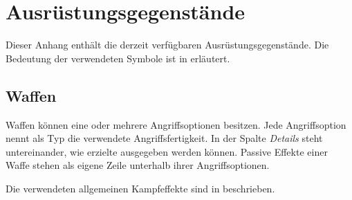\chapter{Ausrüstungsgegenstände}
\label{app:equipment}

Dieser Anhang enthält die derzeit verfügbaren Ausrüstungsgegenstände. Die Bedeutung der verwendeten Symbole ist in  erläutert.

\section{Waffen}

Waffen können eine oder mehrere Angriffsoptionen besitzen. Jede Angriffsoption nennt als Typ die verwendete Angriffsfertigkeit. In der Spalte \emph{Details} steht untereinander, wie erzielte \star{} ausgegeben werden können. Passive Effekte einer Waffe stehen als eigene Zeile unterhalb ihrer Angriffsoptionen.

Die verwendeten allgemeinen Kampfeffekte sind in  beschrieben.

